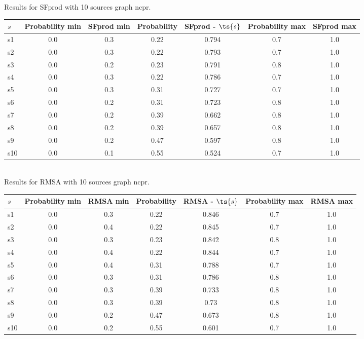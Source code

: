 \documentclass{article}
\begin{document}
\noindent Results for SFprod with 10 sources graph ncpr.

\noindent\begin{tabular}{|l|c|c|c|c|c|c|}
\hline
$s$& Probability min & SFprod min & Probability & SFprod - $\ts{s}$ & Probability max & SFprod max\\
\hline
s1 &0.0 & 0.3 & 0.22 & 0.794 & 0.7 & 1.0\\
\hline
s2 &0.0 & 0.3 & 0.22 & 0.793 & 0.7 & 1.0\\
\hline
s3 &0.0 & 0.2 & 0.23 & 0.791 & 0.8 & 1.0\\
\hline
s4 &0.0 & 0.3 & 0.22 & 0.786 & 0.7 & 1.0\\
\hline
s5 &0.0 & 0.3 & 0.31 & 0.727 & 0.7 & 1.0\\
\hline
s6 &0.0 & 0.2 & 0.31 & 0.723 & 0.8 & 1.0\\
\hline
s7 &0.0 & 0.2 & 0.39 & 0.662 & 0.8 & 1.0\\
\hline
s8 &0.0 & 0.2 & 0.39 & 0.657 & 0.8 & 1.0\\
\hline
s9 &0.0 & 0.2 & 0.47 & 0.597 & 0.8 & 1.0\\
\hline
s10 &0.0 & 0.1 & 0.55 & 0.524 & 0.7 & 1.0\\
\hline
\end{tabular}\\

\noindent Results for RMSA with 10 sources graph ncpr.

\noindent\begin{tabular}{|l|c|c|c|c|c|c|}
\hline
$s$& Probability min & RMSA min & Probability & RMSA - $\ts{s}$ & Probability max & RMSA max\\
\hline
s1 &0.0 & 0.3 & 0.22 & 0.846 & 0.7 & 1.0\\
\hline
s2 &0.0 & 0.4 & 0.22 & 0.845 & 0.7 & 1.0\\
\hline
s3 &0.0 & 0.3 & 0.23 & 0.842 & 0.8 & 1.0\\
\hline
s4 &0.0 & 0.4 & 0.22 & 0.844 & 0.7 & 1.0\\
\hline
s5 &0.0 & 0.4 & 0.31 & 0.788 & 0.7 & 1.0\\
\hline
s6 &0.0 & 0.3 & 0.31 & 0.786 & 0.8 & 1.0\\
\hline
s7 &0.0 & 0.3 & 0.39 & 0.733 & 0.8 & 1.0\\
\hline
s8 &0.0 & 0.3 & 0.39 & 0.73 & 0.8 & 1.0\\
\hline
s9 &0.0 & 0.2 & 0.47 & 0.673 & 0.8 & 1.0\\
\hline
s10 &0.0 & 0.2 & 0.55 & 0.601 & 0.7 & 1.0\\
\hline
\end{tabular}\\
\end{document}
